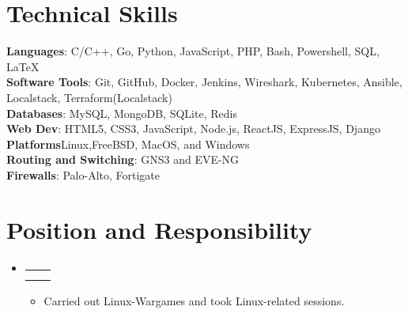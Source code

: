 \documentclass[letterpaper,11pt]{article}
\makeatletter
\newcommand{\resumeItem}[1]{
  \item\small{
    {#1 \vspace{-2pt}}
  }
}
\newcommand{\resumeSubheading}[4]{
  \vspace{-2pt}\item
    \begin{tabular*}{1.0\textwidth}[t]{l@{\extracolsep{\fill}}r}
      \textbf{#1} & \textbf{\small #2} \\
      \textit{\small#3} & \textit{\small #4} \\
    \end{tabular*}\vspace{-7pt}
}
\newcommand{\resumeSubHeadingListStart}{\begin{itemize}[leftmargin=0.0in, label={}]}
\newcommand{\resumeSubHeadingListEnd}{\end{itemize}}
\newcommand{\resumeItemListStart}{\begin{itemize}}
\newcommand{\resumeItemListEnd}{\end{itemize}\vspace{-5pt}}
\makeatother
\begin{document}
\section{Technical Skills}
 \begin{itemize}[leftmargin=0.15in, label={}]
    \small{\item{
     \textbf{Languages}{: C/C++, Go, Python, JavaScript, PHP, Bash, Powershell, SQL, \LaTeX} \\
     \textbf{Software Tools}{: Git, GitHub, Docker, Jenkins, Wireshark, Kubernetes, Ansible, Localstack, Terraform(Localstack)} \\
     \textbf{Databases}{: MySQL, MongoDB, SQLite, Redis} \\
\textbf{Web Dev}{: HTML5, CSS3, JavaScript, Node.js, ReactJS, ExpressJS, Django} \\
\textbf{Platforms}{Linux,FreeBSD, MacOS, and Windows} \\
\textbf{Routing and Switching}{: GNS3 and EVE-NG} \\
\textbf{Firewalls}{: Palo-Alto, Fortigate} \\
    }}
 \end{itemize}
 \vspace{-16pt}


\section{Position and Responsibility}
\vspace{-25pt}
    \resumeSubHeadingListStart
        \resumeSubheading{}{}{}{}
            \resumeItemListStart
                \resumeItem{Carried out Linux-Wargames and took Linux-related sessions.}
            \resumeItemListEnd
        
    \resumeSubHeadingListEnd
\end{document}
